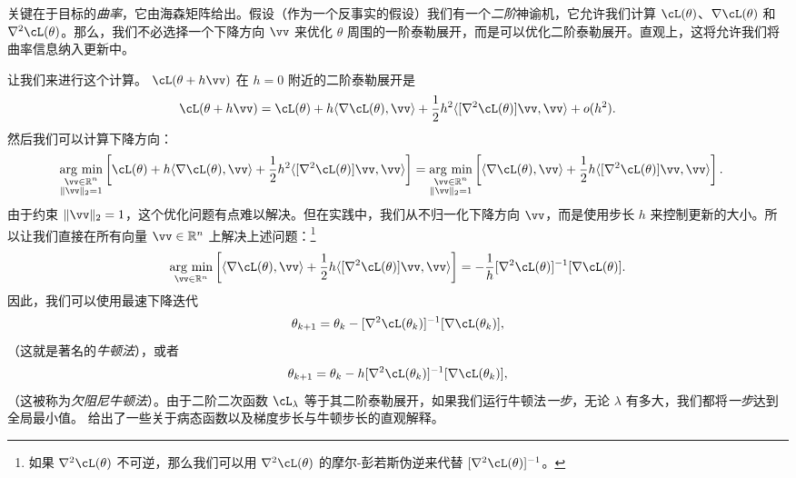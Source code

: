 \documentclass[../../book-main_zh.tex]{subfiles}
\begin{document}
关键在于目标的\textit{曲率}，它由海森矩阵给出。假设（作为一个反事实的假设）我们有一个\textit{二阶}神谕机，它允许我们计算 \(\cL(\theta)\)、\(\nabla \cL(\theta)\) 和 \(\nabla^{2}\cL(\theta)\)。那么，我们不必选择一个下降方向 \(\vv\) 来优化 \(\theta\) 周围的一阶泰勒展开，而是可以优化二阶泰勒展开。直观上，这将允许我们将曲率信息纳入更新中。

让我们来进行这个计算。 \(\cL(\theta + h\vv)\) 在 \(h = 0\) 附近的二阶泰勒展开是
\begin{equation}
    \cL(\theta + h\vv) = \cL(\theta) + h\ip{\nabla \cL(\theta)}{\vv} + \frac{1}{2}h^{2}\ip{[\nabla^{2}\cL(\theta)]\vv}{\vv} + o(h^{2}).
\end{equation}
然后我们可以计算下降方向：
\begin{align}
    \argmin_{\substack{\vv \in \R^{n} \\ \norm{\vv}_{2} = 1}}\bs{\cL(\theta) + h\ip{\nabla \cL(\theta)}{\vv} + \frac{1}{2}h^{2}\ip{[\nabla^{2}\cL(\theta)]\vv}{\vv}} 
    &= \argmin_{\substack{\vv \in \R^{n} \\ \norm{\vv}_{2} = 1}}\bs{\ip{\nabla \cL(\theta)}{\vv} + \frac{1}{2}h\ip{[\nabla^{2}\cL(\theta)]\vv}{\vv}}.
\end{align}
由于约束 \(\norm{\vv}_{2} = 1\)，这个优化问题有点难以解决。但在实践中，我们从不归一化下降方向 \(\vv\)，而是使用步长 \(h\) 来控制更新的大小。所以让我们直接在所有向量 \(\vv \in \R^{n}\) 上解决上述问题：\footnote{如果 \(\nabla^{2}\cL(\theta)\) 不可逆，那么我们可以用 \(\nabla^{2}\cL(\theta)\) 的摩尔-彭若斯伪逆来代替 \([\nabla^{2}\cL(\theta)]^{-1}\)。}
\begin{equation}
    \argmin_{\vv \in \R^{n}}\bs{\ip{\nabla \cL(\theta)}{\vv} + \frac{1}{2}h\ip{[\nabla^{2}\cL(\theta)]\vv}{\vv}} = -\frac{1}{h}[\nabla^{2}\cL(\theta)]^{-1}[\nabla \cL(\theta)].
\end{equation}
因此，我们可以使用最速下降迭代
\begin{equation}
    \theta_{k + 1} = \theta_{k} - [\nabla^{2}\cL(\theta_{k})]^{-1}[\nabla \cL(\theta_{k})],
\end{equation}
（这就是著名的\textit{牛顿法}），或者
\begin{equation}
    \theta_{k + 1} = \theta_{k} - h[\nabla^{2}\cL(\theta_{k})]^{-1}[\nabla \cL(\theta_{k})],
\end{equation}
（这被称为\textit{欠阻尼牛顿法}）。由于二阶二次函数 \(\cL_{\lambda}\) 等于其二阶泰勒展开，如果我们运行牛顿法\textit{一步}，无论 \(\lambda\) 有多大，我们都将\textit{一步}达到全局最小值。 给出了一些关于病态函数以及梯度步长与牛顿步长的直观解释。
\end{document}
